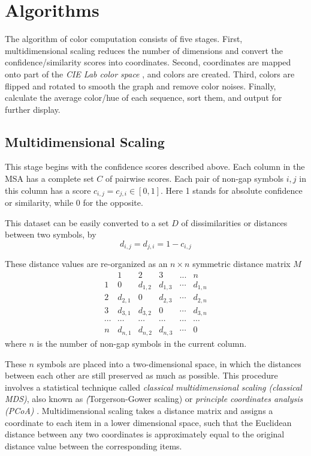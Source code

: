 \chapter{Algorithms}\label{chap:Algorithms}

The algorithm of color computation consists of five stages. First, multidimensional scaling reduces the number of dimensions and convert the confidence/similarity scores into coordinates. Second, coordinates are mapped onto part of the \emph{CIE Lab color space} \cite {McLAREN:1976aa}, and colors are created. Third, colors are flipped and rotated to smooth the graph and remove color noises. Finally, calculate the average color/hue of each sequence, sort them, and output for further display.

\section{Multidimensional Scaling}

This stage begins with the confidence scores described above. Each column in the MSA has a complete set $C$ of pairwise scores. Each pair of non-gap symbols $i,j$ in this column has a score $c_{i,j}=c_{j,i} \in [0,1]$. Here 1 stands for absolute confidence or similarity, while 0 for the opposite.

This dataset can be easily converted to a set $D$ of dissimilarities or distances between two symbols, by $$d_{i,j}=d_{j,i}=1-c_{i,j}$$

These distance values are re-organized as an $n \times n$ symmetric distance matrix $M$
\[ \begin{array}{cccccc}
            & \mbox{1}  & \mbox{2}  & \mbox{3}  & \mbox{...}  & n       \\
\mbox{1}    & 0         & d_{1,2}   & d_{1,3}   & \cdots      & d_{1,n} \\
\mbox{2}    & d_{2,1}   & 0         & d_{2,3}   & \cdots      & d_{2,n} \\
\mbox{3}    & d_{3,1}   & d_{3,2}   & 0         & \cdots      & d_{3,n} \\
\cdots      & \cdots    & \cdots    & \cdots    & \cdots      & \cdots  \\
n           & d_{n,1}   & d_{n,2}   & d_{n,3}   & \cdots      & 0 \end{array} \]
where $n$ is the number of non-gap symbols in the current column.

These $n$ symbols are placed into a two-dimensional space, in which the distances between each other are still preserved as much as possible. This procedure involves a statistical technique called \emph{classical multidimensional scaling (classical MDS)}, also known as \emph(Torgerson-Gower scaling) or \emph{principle coordinates analysis (PCoA)} \cite{GOWER01121966}. Multidimensional scaling takes a distance matrix and assigns a coordinate to each item in a lower dimensional space, such that the Euclidean distance between any two coordinates is approximately equal to the original distance value between the corresponding items.

